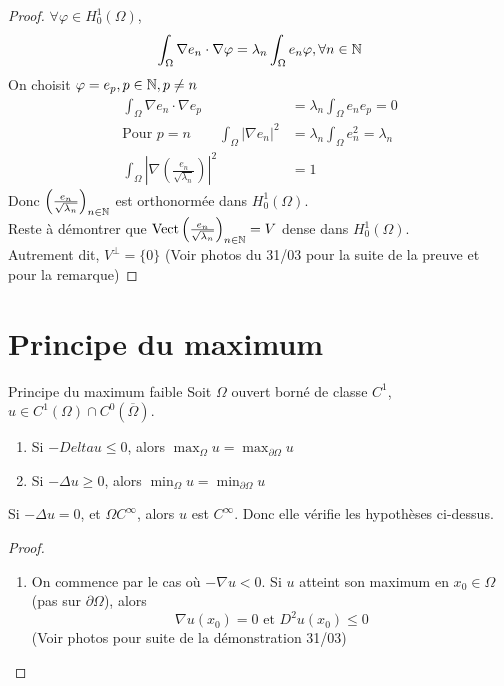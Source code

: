 \documentclass[]{report}
\begin{document}
    \begin{proof}
        $\forall \varphi\in H_0^1(\Omega)$,
        \[\int_\Omega\nabla e_n\cdot\nabla \varphi=\lambda_n \int_\Omega e_n\varphi,\forall n\in \mathbb{N}\]
        On choisit $\varphi=e_p,p\in \mathbb{N},p\neq n$
        \begin{align*}
            \int_\Omega \nabla e_n\cdot\nabla e_p&=\lambda_n \int_\Omega e_n e_p=0\\
            \text{Pour $p=n$}\qquad \int_\Omega |\nabla e_n|^2&=\lambda_n\int_\Omega e_n^2=\lambda_n\\
            \int_\Omega \left|\nabla \left(\frac{e_n}{\sqrt{\lambda_n}}\right)\right|^2&=1
        \end{align*}
        Donc $\left(\frac{e_n}{\sqrt{\lambda_n}}\right)_{n\in\mathbb{N}}$ est orthonormée dans $H_0^1(\Omega)$.\\
        Reste à démontrer que $\text{Vect}\left(\frac{e_n}{\sqrt{\lambda_n}}\right)_{n\in\mathbb{N}}=V$ dense dans $H_0^1(\Omega)$.\\
        Autrement dit, $V^{\perp}=\{0\}$
        (Voir photos du 31/03 pour la suite de la preuve et pour la remarque) 
    \end{proof}

    \section{Principe du maximum}

    \begin{tm}{Principe du maximum faible}{}
        Soit $\Omega$ ouvert borné de classe $C^1$, $u\in C^1(\Omega)\cap C^0(\overline{\Omega})$.
        \begin{enumerate}
            \item Si $-Delta u\le 0$, alors $\max_\Omega u=\max_{\partial \Omega}u$
            \item Si $-\Delta u\ge 0$, alors $\min_\Omega u=\min_{\partial \Omega}u$
        \end{enumerate}
    \end{tm}

    \begin{re}{}{}
        Si $-\Delta u=0$, et $\Omega C^\infty$, alors $u$ est $C^\infty$. Donc elle  vérifie les hypothèses ci-dessus.
    \end{re}

    \begin{proof}
        \begin{enumerate}
            \item On commence par le cas où $-\nabla u<0$. Si $u$ atteint son maximum en $x_0\in \Omega$ (pas sur $\partial \Omega$), alors
            \[\nabla u(x_0)=0\text{ et } D^2u(x_0)\le 0\]
            (Voir photos pour suite de la démonstration 31/03)
        \end{enumerate}
    \end{proof}
\end{document}
